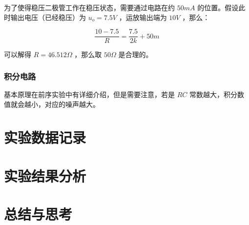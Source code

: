 \documentclass[lang=cn,11pt,a4paper,cite=authoryear]{elegantpaper}
\begin{document}
为了使得稳压二极管工作在稳压状态，需要通过电路在约 \(50 mA\) 的位置。假设此时输出电压（已经稳压）为 \(u_o = 7.5 V\) ，运放输出端为 \(10 V\) ，那么：

\[\frac{10 - 7.5}{R} = \frac{7.5}{2 k} + 50 m\]

可以解得 \(R = 46.512 \Omega\) ，那么取 \(50 \Omega\) 是合理的。


\subsubsection{积分电路} 

基本原理在前序实验中有详细介绍，但是需要注意，若是 \(R C\) 常数越大，积分数值就会越小，对应的噪声越大。

\section{实验数据记录}



\section{实验结果分析}

\section{总结与思考}


\end{document}
